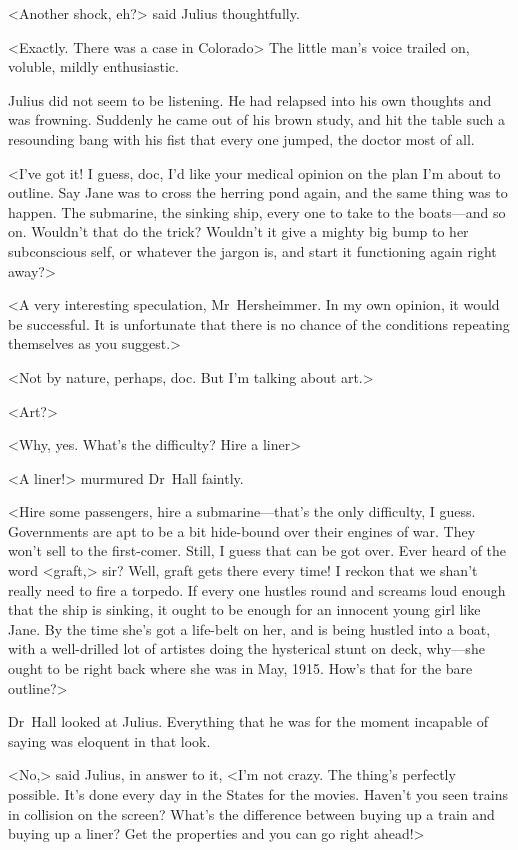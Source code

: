 <Another shock, eh?> said Julius thoughtfully.

<Exactly. There was a case in Colorado\longdash> The little man's voice trailed on, voluble, mildly enthusiastic.

Julius did not seem to be listening. He had relapsed into his own thoughts and was frowning. Suddenly he came out of his brown study, and hit the table such a resounding bang with his fist that every one jumped, the doctor most of all.

<I've got it! I guess, doc, I'd like your medical opinion on the plan I'm about to outline. Say Jane was to cross the herring pond again, and the same thing was to happen. The submarine, the sinking ship, every one to take to the boats—and so on. Wouldn't that do the trick? Wouldn't it give a mighty big bump to her subconscious self, or whatever the jargon is, and start it functioning again right away?>

<A very interesting speculation, Mr~Hersheimmer. In my own opinion, it would be successful. It is unfortunate that there is no chance of the conditions repeating themselves as you suggest.>

<Not by nature, perhaps, doc. But I'm talking about art.>

<Art?>

<Why, yes. What's the difficulty? Hire a liner\longdash>

<A liner!> murmured Dr~Hall faintly.

<Hire some passengers, hire a submarine—that's the only difficulty, I guess. Governments are apt to be a bit hide-bound over their engines of war. They won't sell to the first-comer. Still, I guess that can be got over. Ever heard of the word <graft,> sir? Well, graft gets there every time! I reckon that we shan't really need to fire a torpedo. If every one hustles round and screams loud enough that the ship is sinking, it ought to be enough for an innocent young girl like Jane. By the time she's got a life-belt on her, and is being hustled into a boat, with a well-drilled lot of artistes doing the hysterical stunt on deck, why—she ought to be right back where she was in May, 1915. How's that for the bare outline?>

Dr~Hall looked at Julius. Everything that he was for the moment incapable of saying was eloquent in that look.

<No,> said Julius, in answer to it, <I'm not crazy. The thing's perfectly possible. It's done every day in the States for the movies. Haven't you seen trains in collision on the screen? What's the difference between buying up a train and buying up a liner? Get the properties and you can go right ahead!>

